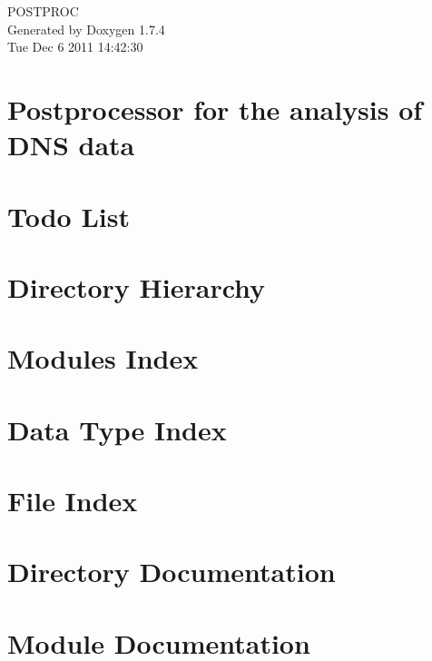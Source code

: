 \documentclass[a4paper]{book}
\begin{document}
\hypersetup{pageanchor=false}
\begin{titlepage}
\vspace*{7cm}
\begin{center}
{\Large POSTPROC }\\
\vspace*{1cm}
{\large Generated by Doxygen 1.7.4}\\
\vspace*{0.5cm}
{\small Tue Dec 6 2011 14:42:30}\\
\end{center}
\end{titlepage}
\clearemptydoublepage
{}
\tableofcontents
\clearemptydoublepage
{}
\hypersetup{pageanchor=true}
\chapter{Postprocessor for the analysis of DNS data}
\label{index}\hypertarget{index}{}
\chapter{Todo List}
\label{todo}
\hypertarget{todo}{}

\chapter{Directory Hierarchy}

\chapter{Modules Index}

\chapter{Data Type Index}

\chapter{File Index}

\chapter{Directory Documentation}

\chapter{Module Documentation}








\end{document}
